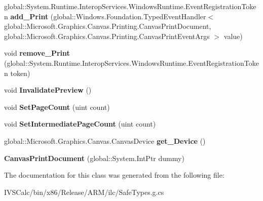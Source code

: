 \begin{DoxyCompactItemize}
\item 
\mbox{\label{class_microsoft_1_1_graphics_1_1_canvas_1_1_printing_1_1_canvas_print_document_a9da3eaf71e29837bb52c49b799a88293}} 
global\+::\+System.\+Runtime.\+Interop\+Services.\+Windows\+Runtime.\+Event\+Registration\+Token {\bfseries add\+\_\+\+Print} (global\+::\+Windows.\+Foundation.\+Typed\+Event\+Handler$<$ global\+::\+Microsoft.\+Graphics.\+Canvas.\+Printing.\+Canvas\+Print\+Document, global\+::\+Microsoft.\+Graphics.\+Canvas.\+Printing.\+Canvas\+Print\+Event\+Args $>$ value)
\item 
\mbox{\label{class_microsoft_1_1_graphics_1_1_canvas_1_1_printing_1_1_canvas_print_document_a247a72beac098c3ac4e60deec5108fb3}} 
void {\bfseries remove\+\_\+\+Print} (global\+::\+System.\+Runtime.\+Interop\+Services.\+Windows\+Runtime.\+Event\+Registration\+Token token)
\item 
\mbox{\label{class_microsoft_1_1_graphics_1_1_canvas_1_1_printing_1_1_canvas_print_document_a8bbb671d9de2e348757da7e7d7c1935c}} 
void {\bfseries Invalidate\+Preview} ()
\item 
\mbox{\label{class_microsoft_1_1_graphics_1_1_canvas_1_1_printing_1_1_canvas_print_document_af703c668de7e2905cf76a064da8dbd29}} 
void {\bfseries Set\+Page\+Count} (uint count)
\item 
\mbox{\label{class_microsoft_1_1_graphics_1_1_canvas_1_1_printing_1_1_canvas_print_document_a570bac56fc10f4180d8e4371d1c2b1ec}} 
void {\bfseries Set\+Intermediate\+Page\+Count} (uint count)
\item 
\mbox{\label{class_microsoft_1_1_graphics_1_1_canvas_1_1_printing_1_1_canvas_print_document_ac10aedd8e487c76596dbcc4eb0804aa4}} 
global\+::\+Microsoft.\+Graphics.\+Canvas.\+Canvas\+Device {\bfseries get\+\_\+\+Device} ()
\item 
\mbox{\label{class_microsoft_1_1_graphics_1_1_canvas_1_1_printing_1_1_canvas_print_document_a7b04c2627b88d8910b67203e8ee65b63}} 
{\bfseries Canvas\+Print\+Document} (global\+::\+System.\+Int\+Ptr dummy)
\end{DoxyCompactItemize}


The documentation for this class was generated from the following file\+:\begin{DoxyCompactItemize}
\item 
I\+V\+S\+Calc/bin/x86/\+Release/\+A\+R\+M/ilc/Safe\+Types.\+g.\+cs\end{DoxyCompactItemize}
